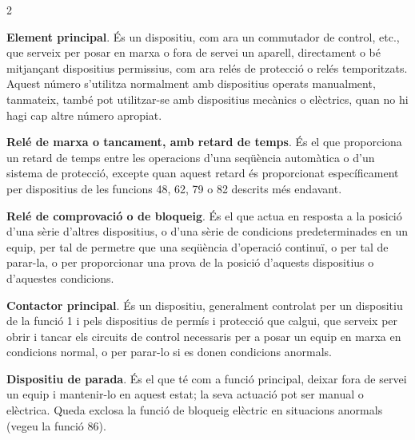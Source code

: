 \begin{multicols}{2}
	\begin{list}{}
		{\setlength{\labelwidth}{6mm} \setlength{\leftmargin}{6mm}
			\setlength{\labelsep}{2mm}}
		
		\item[\textbf{1}]  
		\textbf{Element principal}. És un dispositiu, com ara un commutador de control, etc., que serveix per posar en marxa o fora de servei un aparell, directament o bé  mitjançant
		dispositius permissius, com ara relés de protecció o relés temporitzats. Aquest número s'utilitza normalment amb dispositius operats manualment, tanmateix, també pot utilitzar-se amb dispositius mecànics o elèctrics, quan no hi hagi cap altre número apropiat.
		
		\item[\textbf{2}]    
		  
		\textbf{Relé de marxa o tancament, amb retard de temps}. És el que
		proporciona un retard de temps entre les operacions d'una seqüència
		automàtica o d'un sistema de protecció, excepte quan aquest retard
		és proporcionat específicament per dispositius de les funcions 48, 62, 79 o 82
		descrits més endavant.
		
		\item[\textbf{3}]  
		\textbf{Relé de comprovació o de bloqueig}. És el que actua en resposta a la posició d'una sèrie
		d'altres dispositius, o d'una sèrie de condicions predeterminades
		en un equip, per tal de permetre que una seqüència d'operació
		continuï, o per tal de parar-la, o per proporcionar una prova de la
		posició d'aquests dispositius o d'aquestes condicions.
		
		\item[\textbf{4}]  
		\textbf{Contactor principal}. És un dispositiu,
		generalment controlat per un dispositiu de la funció 1 i pels dispositius de permís i protecció
		que calgui, que serveix per obrir i tancar els circuits de control necessaris per a posar un equip en marxa en condicions normal, o per parar-lo  si es donen condicions anormals.
		
		\item[\textbf{5}]    
		\textbf{Dispositiu de parada}. És el que
		té com a funció principal, deixar fora de servei un equip i
		mantenir-lo en aquest estat; la seva actuació pot ser manual o
		elèctrica. Queda exclosa la funció de bloqueig elèctric en
		situacions anormals (vegeu la funció 86).
		

\end{list}
\end{multicols}
